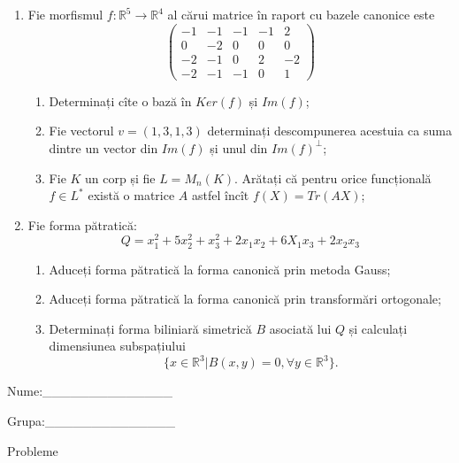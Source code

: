 \documentclass{article}
\begin{document}
\begin{enumerate}
 \item Fie morfismul $f:\mathbb{R}^5 \to \mathbb{R}^4$ al cărui matrice în raport cu bazele canonice este
$$\begin{pmatrix}
-1&-1&-1&-1&2\\
0&-2&0&0&0\\
-2&-1&0&2&-2\\
-2&-1&-1&0&1
\end{pmatrix}$$

\begin{enumerate}
\item Determinați cîte o bază în $Ker(f)$ și $Im(f)$;
\item Fie vectorul $v=(1,3,1,3)$ determinați descompunerea acestuia ca suma dintre un vector din $Im(f)$ și unul din $Im(f)^\perp$;
\item Fie $K$ un corp și fie $L=M_n(K)$. Arătați că pentru orice funcțională $f \in L^*$ există o matrice $A$ astfel încît $f(X)=Tr(AX)$;
\end{enumerate}
\item Fie forma pătratică:
$$Q= x_1^2+5x_2^2+x_3^2+2x_1x_2+6X_1x_3+2x_2x_3$$

\begin{enumerate}
\item Aduceți forma pătratică la forma canonică prin metoda Gauss;
\item Aduceți forma pătratică la forma canonică prin transformări ortogonale;
\item Determinați forma biliniară simetrică $B$ asociată lui $Q$ și calculați dimensiunea subspațiului
$$\{x \in \mathbb{R}^3 | B(x,y)=0,\forall y \in \mathbb{R}^3\}.$$

\end{enumerate}
\end{enumerate}
\newpage
\begin{flushright}
Nume:\_\_\_\_\_\_\_\_\_\_\_\_\_\_
 
 
Grupa:\_\_\_\_\_\_\_\_\_\_\_\_\_\_
\end{flushright}
\begin{center}
\vspace{2cm}
{\Large Probleme}
\vspace{2cm}
\end{center}
\end{document}
